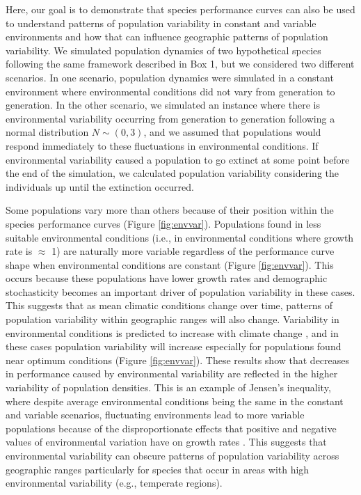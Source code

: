 Here, our goal is to demonstrate that species performance curves can also be used to understand patterns of population variability in constant and variable environments and how that can influence geographic patterns of population variability. We simulated population dynamics of two hypothetical species following the same framework described in Box 1, but we considered two different scenarios. In one scenario, population dynamics were simulated in a constant environment where environmental conditions did not vary from generation to generation. In the other scenario, we simulated an instance where there is environmental variability occurring from generation to generation following a normal distribution $N \sim (0, 3)$, and we assumed that populations would respond immediately to these fluctuations in environmental conditions. If environmental variability caused a population to go extinct at some point before the end of the simulation, we calculated population variability considering the individuals up until the extinction occurred.  

Some populations vary more than others because of their position within the species performance curves (Figure \ref{fig:envvar}). Populations found in less suitable environmental conditions (i.e., in environmental conditions where growth rate is $\approx$ 1) are naturally more variable regardless of the performance curve shape when environmental conditions are constant (Figure \ref{fig:envvar}). This occurs because these populations have lower growth rates and demographic stochasticity becomes an important driver of population variability in these cases. This suggests that as mean climatic conditions change over time, patterns of population variability within geographic ranges will also change. Variability in environmental conditions is predicted to increase with climate change \parencite{vasseur2014,kingsolver2017}, and in these cases population variability will increase especially for populations found near optimum conditions (Figure \ref{fig:envvar}). These results show that decreases in performance caused by environmental variability \parencite{dowd2015, kingsolver2017} are reflected in the higher variability of population densities. This is an example of Jensen's inequality, where despite average environmental conditions being the same in the constant and variable scenarios, fluctuating environments lead to more variable populations because of the disproportionate effects that positive and negative values of environmental variation have on growth rates \parencite{ruel1999, vasseur2014}. This suggests that environmental variability can obscure patterns of population variability across geographic ranges particularly for species that occur in areas with high environmental variability (e.g., temperate regions). 


